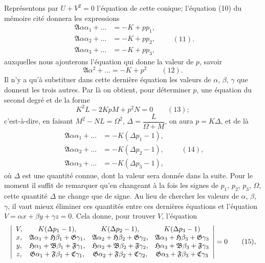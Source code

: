 \documentclass[11pt]{article}
\begin{document}
\noindent Repr\'esentons par $U + V^{2} = 0$ l'\'equation de cette conique; l'\'equation (10) du m\'emoire cit\'e donnera les expressions
\[
\begin{aligned}
\mathfrak{A}\alpha\alpha_{1} + \dots &= -K + p p_{1},\\
\mathfrak{A}\alpha\alpha_{2} + \dots &= -K + p p_{2},\\
\mathfrak{A}\alpha\alpha_{3} + \dots &= -K + p p_{3},
\end{aligned}\qquad (11).
\]
auxquelles nous ajouterons l'\'equation qui donne la valeur de $p$, savoir
\[
\mathfrak{A}\alpha^{2} + \dots = -K + p^{2} \qquad (12).
\]
Il n'y a qu'\`a substituer dans cette derni\`ere \'equation les valeurs de $\alpha$, $\beta$, $\gamma$ que donnent les trois autres. Par l\`a on obtient, pour d\'eterminer $p$, une \'equation du second degr\'e et de la forme
\[
K^{2} L - 2 K p M + p^{2} N = 0 \qquad (13);
\]
c'est-\`a-dire, en faisant $M^{2} - N L = \Omega^{2}$, $\Delta = \dfrac{L}{\Omega + M}$, on aura $p = K\Delta$, et de l\`a
\[
\begin{aligned}
\mathfrak{A}\alpha\alpha_{1} + \dots &= -K(\Delta p_{1} - 1),\\
\mathfrak{A}\alpha\alpha_{2} + \dots &= -K(\Delta p_{2} - 1),\\
\mathfrak{A}\alpha\alpha_{3} + \dots &= -K(\Delta p_{3} - 1),
\end{aligned}\qquad (14),
\]
o\`u $\Delta$ est une quantit\'e connue, dont la valeur sera donn\'ee dans la suite. Pour le moment il suffit de remarquer qu'en changeant \`a la fois les signes de $p_{1}$, $p_{2}$, $p_{3}$, $\Omega$, cette quantit\'e $\Delta$ ne change que de signe. Au lieu de chercher les valeurs de $\alpha$, $\beta$, $\gamma$, il vaut mieux \'eliminer ces quantit\'es entre ces derni\`eres \'equations et l'\'equation $V = \alpha x + \beta y + \gamma z = 0$. Cela donne, pour trouver $V$, l'\'equation
\[ \resizebox{\textwidth}{!}{$\displaystyle
\left|\begin{array}{cccc}
V, & K(\Delta p_{1} - 1), & K(\Delta p_{2} - 1), & K(\Delta p_{3} - 1) \\
x, & \mathfrak{A}\alpha_{1} + \mathfrak{H}\beta_{1} + \mathfrak{G}\gamma_{1}, & \mathfrak{A}\alpha_{2} + \mathfrak{H}\beta_{2} + \mathfrak{G}\gamma_{2}, & \mathfrak{A}\alpha_{3} + \mathfrak{H}\beta_{3} + \mathfrak{G}\gamma_{3} \\
y, & \mathfrak{H}\alpha_{1} + \mathfrak{B}\beta_{1} + \mathfrak{F}\gamma_{1}, & \mathfrak{H}\alpha_{2} + \mathfrak{B}\beta_{2} + \mathfrak{F}\gamma_{2}, & \mathfrak{H}\alpha_{3} + \mathfrak{B}\beta_{3} + \mathfrak{F}\gamma_{3} \\
z, & \mathfrak{G}\alpha_{1} + \mathfrak{F}\beta_{1} + \mathfrak{C}\gamma_{1}, & \mathfrak{G}\alpha_{2} + \mathfrak{F}\beta_{2} + \mathfrak{C}\gamma_{2}, & \mathfrak{G}\alpha_{3} + \mathfrak{F}\beta_{3} + \mathfrak{C}\gamma_{3}
\end{array}\right| = 0\qquad (15),
$} \]
\end{document}
